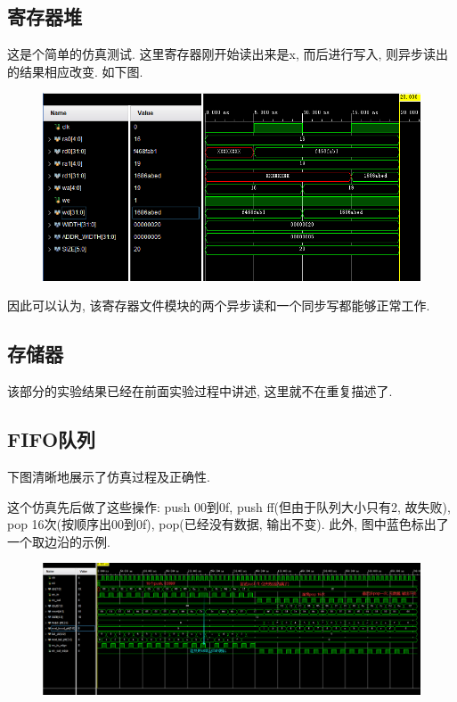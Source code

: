 \documentclass[UTF8]{article}
\begin{document}
\subsection{寄存器堆}
这是个简单的仿真测试. 这里寄存器刚开始读出来是x, 而后进行写入, 则异步读出的结果相应改变. 如下图.
\begin{figure}[H]
	\centering
	\includegraphics[scale=0.5]{register_file.png}
\end{figure}\par
因此可以认为, 该寄存器文件模块的两个异步读和一个同步写都能够正常工作.
\subsection{存储器}
该部分的实验结果已经在前面实验过程中讲述, 这里就不在重复描述了.
\subsection{FIFO队列}
下图清晰地展示了仿真过程及正确性.\par
这个仿真先后做了这些操作: push 00到0f, push ff(但由于队列大小只有2, 故失败), pop 16次(按顺序出00到0f), pop(已经没有数据, 输出不变).
此外, 图中蓝色标出了一个取边沿的示例.\par
\begin{figure}[H]
	\centering
	\includegraphics[scale=0.30]{queue_width4_illustrate.png}
\end{figure}\par
\end{document}
